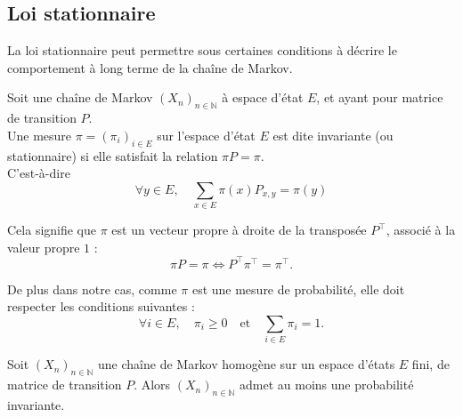 \documentclass{article}
\begin{document}

\subsection{Loi stationnaire}

La loi stationnaire peut permettre sous certaines conditions à décrire le comportement à long terme de la chaîne de Markov. \\

\begin{tcolorbox}[colback=white,colframe=red!80!black,title=Mesure invariante/stationnaire]
Soit une chaîne de Markov $(X_n)_{n \in \mathbb{N}}$ à espace d'état $E$, et ayant pour matrice de transition $P$. \\

Une mesure $\pi = (\pi_i)_{i \in E}$ sur l'espace d'état $E$ est dite invariante (ou stationnaire) si elle satisfait la relation $\pi P = \pi$. \\

C'est-à-dire
\[
\forall y \in E, \quad \sum_{x \in E} \pi(x) P_{x, y} = \pi(y)
\]
\end{tcolorbox}

Cela signifie que $\pi$ est un vecteur propre à droite de la transposée $P^{\top}$, associé à la valeur propre $1$ :
\[
\pi P = \pi \iff P^{\top} \pi^{\top} = \pi^{\top}.
\]

De plus dans notre cas, comme $\pi$ est une mesure de probabilité, elle doit respecter les conditions suivantes :
\[
\forall i \in E, \quad \pi_i \geq 0 \quad \text{et} \quad \sum_{i \in E} \pi_i = 1.
\]

\begin{tcolorbox}[colback=white,colframe=blue!80!black,title=Existence d'une probabilité invariante]
Soit $(X_n)_{n \in \mathbb{N}}$ une chaîne de Markov homogène sur un espace d'états $E$ fini, de matrice de transition $P$. Alors $(X_n)_{n \in \mathbb{N}}$ admet au moins une probabilité invariante.
\end{tcolorbox}
\end{document}
